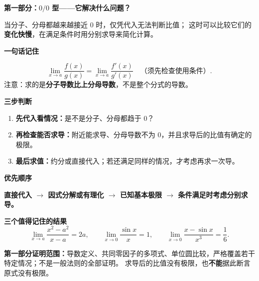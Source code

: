 \clearpage
\begin{summarybox}

\textbf{\textcolor{CSummary}{第一部分：$0/0$ 型——它解决什么问题？}}

当分子、分母都越来越接近 $0$ 时，仅凭代入无法判断比值；
这时可以比较它们的\textbf{变化快慢}，在满足条件时用分别求导来简化计算。

\medskip
\textbf{\textcolor{CSummary}{一句话记住}}

\[
\boxed{\displaystyle
\lim_{x\to a}\frac{f(x)}{g(x)}=\lim_{x\to a}\frac{f'(x)}{g'(x)}
\quad\text{（须先检查使用条件）}.}
\]
注意：求的是\textbf{分子导数比上分母导数}，不是整个分式的导数。

\medskip
\textbf{\textcolor{CSummary}{三步判断}}
\begin{enumerate}[leftmargin=*, itemsep=0.3em, topsep=0.3em]
  \item \textbf{先代入看情况：}是不是分子、分母都趋于 $0$？
  \item \textbf{再检查能否求导：}附近能求导、分母导数不为 $0$，并且求导后的比值有确定的极限。
  \item \textbf{最后求值：}约分或直接代入；若还满足同样的情况，才考虑再求一次导。
\end{enumerate}

\medskip
\textbf{\textcolor{CSummary}{优先顺序}}

\textbf{直接代入 $\rightarrow$ 因式分解或有理化 $\rightarrow$ 已知基本极限 $\rightarrow$ 条件满足时考虑分别求导。}

\medskip
\textbf{\textcolor{CSummary}{三个值得记住的结果}}
\[
\lim_{x\to a}\frac{x^2-a^2}{x-a}=2a,
\qquad
\lim_{x\to0}\frac{\sin x}{x}=1,
\qquad
\lim_{x\to0}\frac{x-\sin x}{x^3}=\frac16.
\]

\textbf{第一部分证明范围：}导数定义、共同零因子的多项式、单位圆比较，严格覆盖若干特定情况；不是一般法则的全部证明。
求导后的比值没有极限，也\textbf{不能}据此断言原式没有极限。

\end{summarybox}

